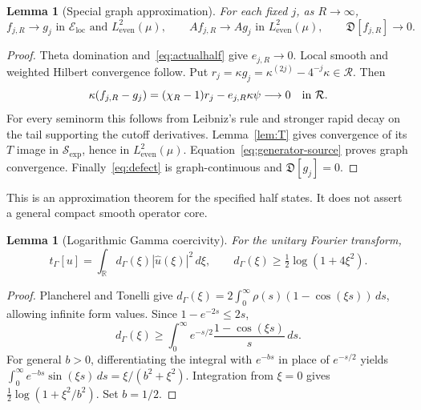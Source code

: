 \documentclass[11pt,a4paper]{article}
\numberwithin{equation}{section}
\newtheorem{lemma}[theorem]{Lemma}
\theoremstyle{definition}
\theoremstyle{remark}
\newcommand{\R}{\mathbb R}
\newcommand{\He}{L^2_{\mathrm{even}}(\mu)}
\newcommand{\tg}{t_{\Gamma}}
\newcommand{\RR}{\mathcal R}
\newcommand{\SSS}{\mathcal S_{\!\exp}}
\newcommand{\Eloc}{\mathcal E_{\mathrm{loc}}}
\newcommand{\Def}{\mathfrak D}
\begin{document}
\begin{lemma}[Special graph approximation]\label{lem:graph}
For each fixed $j$, as $R\to\infty$,
\[
 f_{j,R}\to g_j\text{ in }\Eloc\text{ and }\He,
 \qquad Af_{j,R}\to Ag_j\text{ in }\He,
 \qquad\Def[f_{j,R}]\to0.
\]
\end{lemma}
\begin{proof}
Theta domination and~\eqref{eq:actualhalf} give $e_{j,R}\to0$. Local smooth and weighted Hilbert convergence follow. Put $r_j=\kappa g_j=\kappa^{(2j)}-4^{-j}\kappa\in\RR$. Then
\[
 \kappa(f_{j,R}-g_j)=(\chi_R-1)r_j-e_{j,R}\kappa\psi\longrightarrow0
 \quad\hbox{in }\RR.
\]
For every seminorm this follows from Leibniz's rule and stronger rapid decay on the tail supporting the cutoff derivatives. Lemma~\ref{lem:T} gives convergence of its $T$ image in $\SSS$, hence in $\He$. Equation~\eqref{eq:generator-source} proves graph convergence. Finally~\eqref{eq:defect} is graph-continuous and $\Def[g_j]=0$.
\end{proof}

This is an approximation theorem for the specified half states. It does not assert a general compact smooth operator core.

\begin{lemma}[Logarithmic Gamma coercivity]\label{lem:fourier}
For the unitary Fourier transform,
\begin{equation}\label{eq:multiplier}
 \tg[u]=\int_\R d_\Gamma(\xi)|\widehat u(\xi)|^2\,d\xi,
 \qquad d_\Gamma(\xi)\ge\tfrac12\log(1+4\xi^2).
\end{equation}
\end{lemma}
\begin{proof}
Plancherel and Tonelli give $d_\Gamma(\xi)=2\int_0^\infty\rho(s)(1-\cos(\xi s))\,ds$, allowing infinite form values. Since $1-e^{-2s}\le2s$,
\[
 d_\Gamma(\xi)\ge\int_0^\infty e^{-s/2}\frac{1-\cos(\xi s)}s\,ds.
\]
For general $b>0$, differentiating the integral with $e^{-bs}$ in place of $e^{-s/2}$ yields $\int_0^\infty e^{-bs}\sin(\xi s)\,ds=\xi/(b^2+\xi^2)$. Integration from $\xi=0$ gives $\tfrac12\log(1+\xi^2/b^2)$. Set $b=1/2$.
\end{proof}
\end{document}
